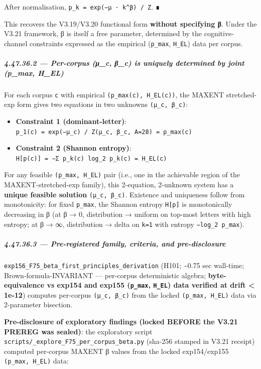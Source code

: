 \documentclass[
]{article}
\providecommand{\tightlist}{%
  \setlength{\itemsep}{0pt}\setlength{\parskip}{0pt}}
\begin{document}
After normalisation, \texttt{p\_k\ =\ exp(−μ\ ·\ k\^{}β)\ /\ Z}. ∎

This recovers the V3.19/V3.20 functional form \textbf{without specifying
β}. Under the V3.21 framework, β is itself a free parameter, determined
by the cognitive-channel constraints expressed as the empirical
(\texttt{p\_max}, \texttt{H\_EL}) data per corpus.

\subparagraph{4.47.36.2 --- Per-corpus (μ\_c, β\_c) is uniquely
determined by joint (p\_max,
H\_EL)}\label{per-corpus-ux3bc_c-ux3b2_c-is-uniquely-determined-by-joint-p_max-h_el}

For each corpus \texttt{c} with empirical
\texttt{(p\_max(c),\ H\_EL(c))}, the MAXENT stretched-exp form gives two
equations in two unknowns \texttt{(μ\_c,\ β\_c)}:

\begin{itemize}
\tightlist
\item
  \textbf{Constraint 1 (dominant-letter)}:
  \texttt{p\_1(c)\ =\ exp(−μ\_c)\ /\ Z(μ\_c,\ β\_c,\ A=28)\ =\ p\_max(c)}
\item
  \textbf{Constraint 2 (Shannon entropy)}:
  \texttt{H{[}p(c){]}\ =\ −Σ\ p\_k(c)\ log\_2\ p\_k(c)\ =\ H\_EL(c)}
\end{itemize}

For any feasible \texttt{(p\_max,\ H\_EL)} pair (i.e., one in the
achievable region of the MAXENT-stretched-exp family), this 2-equation,
2-unknown system has a \textbf{unique feasible solution}
\texttt{(μ\_c,\ β\_c)}. Existence and uniqueness follow from
monotonicity: for fixed \texttt{p\_max}, the Shannon entropy
\texttt{H{[}p{]}} is monotonically decreasing in β (at β → 0,
distribution → uniform on top-most letters with high entropy; at β → ∞,
distribution → delta on \texttt{k=1} with entropy
\texttt{−log\_2\ p\_max}).

\subparagraph{4.47.36.3 --- Pre-registered family, criteria, and
pre-disclosure}\label{pre-registered-family-criteria-and-pre-disclosure-1}

\texttt{exp156\_F75\_beta\_first\_principles\_derivation} (H101;
\textasciitilde0.75 sec wall-time; Brown-formula-INVARIANT ---
per-corpus deterministic algebra; \textbf{byte-equivalence vs exp154 and
exp155 (\texttt{p\_max}, \texttt{H\_EL}) data verified at drift
\textless{} 1e-12}) computes per-corpus \texttt{(μ\_c,\ β\_c)} from the
locked \texttt{(p\_max,\ H\_EL)} data via 2-parameter bisection.

\textbf{Pre-disclosure of exploratory findings (locked BEFORE the V3.21
PREREG was sealed)}: the exploratory script
\texttt{scripts/\_explore\_F75\_per\_corpus\_beta.py} (sha-256 stamped
in V3.21 receipt) computed per-corpus MAXENT β values from the locked
exp154/exp155 \texttt{(p\_max,\ H\_EL)} data:
\end{document}

